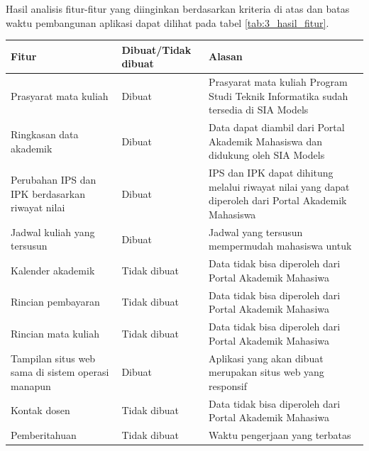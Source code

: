 \documentclass[a4paper,twoside]{article}
\begin{document}
\begin{enumerate}
Hasil analisis fitur-fitur yang diinginkan berdasarkan kriteria di atas dan batas waktu pembangunan aplikasi dapat dilihat pada tabel \ref{tab:3_hasil_fitur}.
\begin{table}[H]
	\centering
    \begin{tabular}{|p{4.5cm}|p{2.5cm}|p{8cm}|}
		\hline
		Fitur & Dibuat/Tidak dibuat & Alasan\\
		\hline
		Prasyarat mata kuliah                             & Dibuat       & Prasyarat mata kuliah Program Studi Teknik Informatika sudah tersedia di SIA Models                   \\
		\hline
    Ringkasan data akademik                               & Dibuat       & Data dapat diambil dari Portal Akademik Mahasiswa dan didukung oleh SIA Models                        \\
		\hline
    Perubahan IPS dan IPK berdasarkan riwayat nilai   & Dibuat       &  IPS dan IPK dapat dihitung melalui riwayat nilai yang dapat diperoleh dari Portal Akademik Mahasiswa \\
		\hline
    Jadwal kuliah yang tersusun                       & Dibuat       & Jadwal yang tersusun mempermudah mahasiswa untuk                                                      \\
		\hline
    Kalender akademik                                 & Tidak dibuat & Data tidak bisa diperoleh dari Portal Akademik Mahasiwa                                               \\
		\hline
    Rincian pembayaran                                & Tidak dibuat & Data tidak bisa diperoleh dari Portal Akademik Mahasiwa                                               \\
		\hline
    Rincian mata kuliah                               & Tidak dibuat & Data tidak bisa diperoleh dari Portal Akademik Mahasiwa                                               \\
		\hline
    Tampilan situs web sama di sistem operasi manapun & Dibuat       & Aplikasi yang akan dibuat merupakan situs web yang responsif                                          \\
		\hline
    Kontak dosen                                      & Tidak dibuat & Data tidak bisa diperoleh dari Portal Akademik Mahasiwa                                               \\
		\hline
    Pemberitahuan                                     & Tidak dibuat & Waktu pengerjaan yang terbatas                                                                        \\

\end{tabular}
\end{table}
\end{enumerate}
\end{document}
